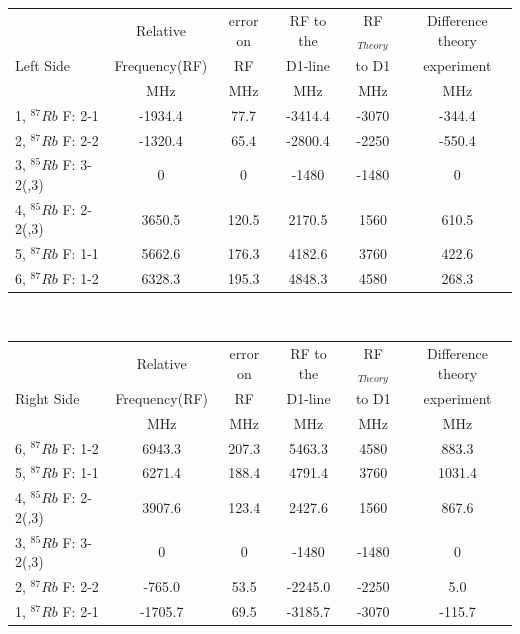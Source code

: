 


\begin{center}%
\begin{tabular}[H]{| l | c c c c c |} \hline
 & Relative & error on & RF to the & RF$_{Theory}$ & Difference theory \\
Left Side & Frequency\footnotemark[1] (RF) & RF & D1-line & to D1 & experiment\\ \cline{2-6}
 & MHz & MHz & MHz & MHz & MHz \\ \hline \hline
1, $^{87}Rb$ F: 2-1 & -1934.4 & 77.7 & -3414.4 & -3070 & -344.4  	\\
2, $^{87}Rb$ F: 2-2 & -1320.4 & 65.4 & -2800.4 & -2250 & -550.4  	\\
3, $^{85}Rb$ F: 3-2(,3) &        0    & 0 & -1480 & -1480 & 0 		 \\
4, $^{85}Rb$ F: 2-2(,3) & 3650.5 & 120.5 & 2170.5 & 1560 & 610.5  		\\
5, $^{87}Rb$ F: 1-1 & 5662.6  & 176.3 & 4182.6 & 3760 & 422.6 		\\
6, $^{87}Rb$ F: 1-2 & 6328.3  & 195.3 & 4848.3 & 4580 & 268.3  		\\ \hline
\end{tabular}\\ 
\end{center}



\begin{center}%
\begin{tabular}[H]{| l | c c c c c |} \hline
 & Relative & error on & RF to the & RF$_{Theory}$ & Difference theory \\
Right Side & Frequency\footnotemark[1] (RF) & RF & D1-line & to D1 & experiment\\ \cline{2-6}
 & MHz & MHz & MHz & MHz & MHz \\ \hline \hline
6, $^{87}Rb$ F: 1-2 & 6943.3 & 207.3 & 5463.3 & 4580 & 883.3 	\\
5, $^{87}Rb$ F: 1-1 & 6271.4 & 188.4 & 4791.4 & 3760 & 1031.4 	\\
4, $^{85}Rb$ F: 2-2(,3) & 3907.6 & 123.4 & 2427.6 & 1560 & 867.6 	\\
3, $^{85}Rb$ F: 3-2(,3) & 0 	  & 0 & -1480   & -1480 & 0  		\\
2, $^{87}Rb$ F: 2-2 & -765.0  & 53.5 & -2245.0& -2250 & 5.0  		\\
1, $^{87}Rb$ F: 2-1 & -1705.7& 69.5 & -3185.7& -3070 & -115.7 	\\ \hline
\end{tabular}
\end{center}

